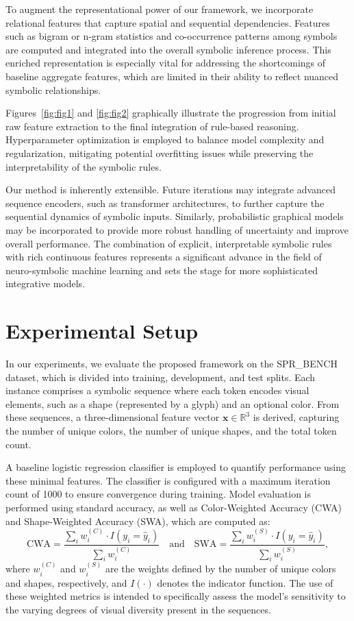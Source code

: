 \documentclass[11pt]{article}
\begin{document}
To augment the representational power of our framework, we incorporate relational features that capture spatial and sequential dependencies. Features such as bigram or n-gram statistics and co-occurrence patterns among symbols are computed and integrated into the overall symbolic inference process. This enriched representation is especially vital for addressing the shortcomings of baseline aggregate features, which are limited in their ability to reflect nuanced symbolic relationships.

Figures~\ref{fig:fig1} and \ref{fig:fig2} graphically illustrate the progression from initial raw feature extraction to the final integration of rule-based reasoning. Hyperparameter optimization is employed to balance model complexity and regularization, mitigating potential overfitting issues while preserving the interpretability of the symbolic rules.

Our method is inherently extensible. Future iterations may integrate advanced sequence encoders, such as transformer architectures, to further capture the sequential dynamics of symbolic inputs. Similarly, probabilistic graphical models may be incorporated to provide more robust handling of uncertainty and improve overall performance. The combination of explicit, interpretable symbolic rules with rich continuous features represents a significant advance in the field of neuro-symbolic machine learning and sets the stage for more sophisticated integrative models.

\section{Experimental Setup}
In our experiments, we evaluate the proposed framework on the SPR\_BENCH dataset, which is divided into training, development, and test splits. Each instance comprises a symbolic sequence where each token encodes visual elements, such as a shape (represented by a glyph) and an optional color. From these sequences, a three-dimensional feature vector \( \mathbf{x} \in \mathbb{R}^3 \) is derived, capturing the number of unique colors, the number of unique shapes, and the total token count.

A baseline logistic regression classifier is employed to quantify performance using these minimal features. The classifier is configured with a maximum iteration count of 1000 to ensure convergence during training. Model evaluation is performed using standard accuracy, as well as Color-Weighted Accuracy (CWA) and Shape-Weighted Accuracy (SWA), which are computed as:
\[
\text{CWA} = \frac{\sum_{i} w^{(C)}_{i} \cdot I(y_i = \hat{y}_i)}{\sum_{i} w^{(C)}_{i}} \quad \text{and} \quad \text{SWA} = \frac{\sum_{i} w^{(S)}_{i} \cdot I(y_i = \hat{y}_i)}{\sum_{i} w^{(S)}_{i}},
\]
where \(w^{(C)}_{i}\) and \(w^{(S)}_{i}\) are the weights defined by the number of unique colors and shapes, respectively, and \(I(\cdot)\) denotes the indicator function. The use of these weighted metrics is intended to specifically assess the model’s sensitivity to the varying degrees of visual diversity present in the sequences.
\end{document}
